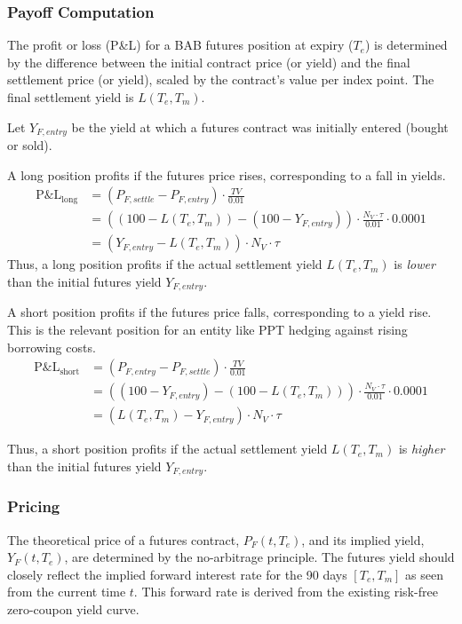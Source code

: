 \documentclass[11pt, a4paper, british]{article}
\begin{document}
\subsubsection{Payoff Computation}
The profit or loss (P\&L) for a BAB futures position at expiry ($T_e$) is determined by the difference between the initial contract price (or yield) and the final settlement price (or yield), scaled by the contract's value per index point. The final settlement yield is $L(T_e, T_m)$.

Let $Y_{F, entry}$ be the yield at which a futures contract was initially entered (bought or sold).

A long position profits if the futures price rises, corresponding to a fall in yields.
\begin{align}
 \text{P\&L}_{\text{long}} &= (P_{F,settle} - P_{F,entry}) \cdot \frac{TV}{0.01} \\
 &= ((100 - L(T_e, T_m)) - (100 - Y_{F,entry})) \cdot \frac{N_V \cdot \tau}{0.01} \cdot 0.0001 \nonumber \\
 &= (Y_{F,entry} - L(T_e, T_m)) \cdot N_V \cdot \tau \label{eq:long_futures_pnl}
\end{align}
Thus, a long position profits if the actual settlement yield $L(T_e, T_m)$ is \textit{lower} than the initial futures yield $Y_{F, entry}$.

A short position profits if the futures price falls, corresponding to a yield rise. This is the relevant position for an entity like PPT hedging against rising borrowing costs.
\begin{align}
 \text{P\&L}_{\text{short}} &= (P_{F,entry} - P_{F,settle}) \cdot \frac{TV}{0.01} \\
 &= ((100 - Y_{F,entry}) - (100 - L(T_e, T_m))) \cdot \frac{N_V \cdot \tau}{0.01} \cdot 0.0001 \nonumber \\
 &= (L(T_e, T_m) - Y_{F,entry}) \cdot N_V \cdot \tau \label{eq:short_futures_pnl}
\end{align}

Thus, a short position profits if the actual settlement yield $L(T_e, T_m)$ is \textit{higher} than the initial futures yield $Y_{F, entry}$.

\subsubsection{Pricing}
The theoretical price of a futures contract, $P_F(t, T_e)$, and its implied yield, $Y_F(t, T_e)$, are determined by the no-arbitrage principle. The futures yield should closely reflect the implied forward interest rate for the 90 days $[T_e, T_m]$ as seen from the current time $t$. This forward rate is derived from the existing risk-free zero-coupon yield curve.
\end{document}
